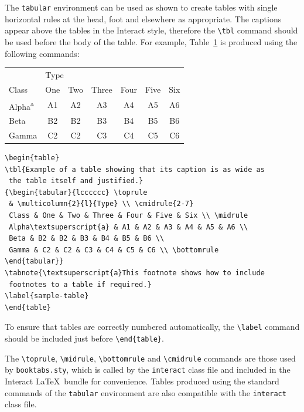 \documentclass[]{interact}
\theoremstyle{plain}%
\theoremstyle{definition}
\theoremstyle{remark}
\begin{document}
The \texttt{tabular} environment can be used as shown to create tables with single horizontal rules at the head, foot and elsewhere as appropriate. The captions appear above the tables in the \textsf{Interact} style, therefore the \verb"\tbl" command should be used before the body of the table. For example, Table~\ref{sample-table} is produced using the following commands:
\begin{table}
{\begin{tabular}{lcccccc} \toprule
 & \multicolumn{2}{l}{Type} \\ \cmidrule{2-7}
 Class & One & Two & Three & Four & Five & Six \\ \midrule
 Alpha\textsuperscript{a} & A1 & A2 & A3 & A4 & A5 & A6 \\
 Beta & B2 & B2 & B3 & B4 & B5 & B6 \\
 Gamma & C2 & C2 & C3 & C4 & C5 & C6 \\ \bottomrule
\end{tabular}}
\label{sample-table}
\end{table}
\begin{verbatim}
\begin{table}
\tbl{Example of a table showing that its caption is as wide as
 the table itself and justified.}
{\begin{tabular}{lcccccc} \toprule
 & \multicolumn{2}{l}{Type} \\ \cmidrule{2-7}
 Class & One & Two & Three & Four & Five & Six \\ \midrule
 Alpha\textsuperscript{a} & A1 & A2 & A3 & A4 & A5 & A6 \\
 Beta & B2 & B2 & B3 & B4 & B5 & B6 \\
 Gamma & C2 & C2 & C3 & C4 & C5 & C6 \\ \bottomrule
\end{tabular}}
\tabnote{\textsuperscript{a}This footnote shows how to include
 footnotes to a table if required.}
\label{sample-table}
\end{table}
\end{verbatim}

To ensure that tables are correctly numbered automatically, the \verb"\label" command should be included just before \verb"\end{table}".

The \verb"\toprule", \verb"\midrule", \verb"\bottomrule" and \verb"\cmidrule" commands are those used by \verb"booktabs.sty", which is called by the \texttt{interact} class file and included in the \textsf{Interact} \LaTeX\ bundle for convenience. Tables produced using the standard commands of the \texttt{tabular} environment are also compatible with the \texttt{interact} class file.
\end{document}
